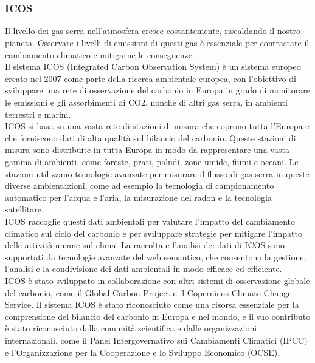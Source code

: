 \chapter{\introductionname}
\label{chap:introduction}

\subsection{ICOS}

Il livello dei gas serra nell'atmosfera cresce costantemente, riscaldando il nostro pianeta. Osservare 
i livelli di emissioni di questi gas è essenziale per contrastare il cambiamento climatico e mitigarne le 
conseguenze. \\

Il sistema ICOS (Integrated Carbon Observation System) è un sistema europeo creato nel 2007 come parte della ricerca 
ambientale europea, con l'obiettivo di sviluppare una rete di osservazione del carbonio in Europa
in grado di monitorare le emissioni e gli assorbimenti di CO2, nonché di altri gas serra,
in ambienti terrestri e marini. \\

ICOS si basa su una vasta rete di stazioni di misura che coprono tutta l'Europa e che forniscono 
dati di alta qualità sul bilancio del carbonio. Queste stazioni di misura sono distribuite in 
tutta Europa in modo da rappresentare una vasta gamma di ambienti, come foreste, prati, paludi,
zone umide, fiumi e oceani. Le stazioni utilizzano tecnologie avanzate per misurare il flusso
di gas serra in queste diverse ambientazioni, come ad esempio la tecnologia di campionamento 
automatico per l'acqua e l'aria, la misurazione del radon e la tecnologia satellitare.\\

ICOS raccoglie questi dati ambientali per valutare l'impatto del cambiamento climatico
sul ciclo del carbonio e per sviluppare strategie per mitigare l'impatto delle attività
umane sul clima. La raccolta e l'analisi dei dati di ICOS sono supportati da tecnologie 
avanzate del web semantico, che consentono la gestione, l'analisi e la condivisione dei dati 
ambientali in modo efficace ed efficiente. \\

ICOS è stato sviluppato in collaborazione con altri sistemi di osservazione globale del carbonio,
come il Global Carbon Project e il Copernicus Climate Change Service.
Il sistema ICOS è stato riconosciuto come una risorsa essenziale per la comprensione
del bilancio del carbonio in Europa e nel mondo, e il suo contributo è stato riconosciuto
dalla comunità scientifica e dalle organizzazioni internazionali, come il Panel Intergovernativo
sui Cambiamenti Climatici (IPCC) e l'Organizzazione per la Cooperazione e lo Sviluppo Economico (OCSE). \\

